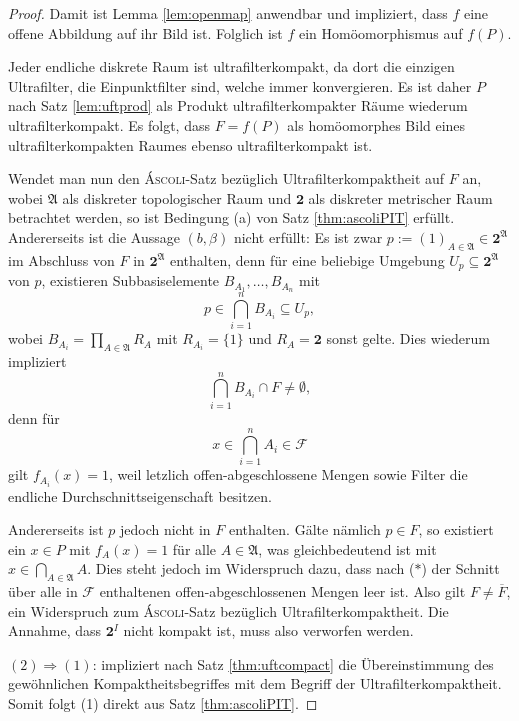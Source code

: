 \begin{proof}
  Damit ist Lemma \ref{lem:openmap} anwendbar und impliziert, dass $f$ eine offene Abbildung auf ihr Bild ist.
  Folglich ist $f$ ein Homöomorphismus auf $f(P)$.

  Jeder endliche diskrete Raum ist ultrafilterkompakt, da dort die einzigen Ultrafilter, die Einpunktfilter sind, welche immer konvergieren.
  Es ist daher $P$ nach Satz \ref{lem:uftprod} als Produkt ultrafilterkompakter Räume wiederum ultrafilterkompakt.
  Es folgt, dass $F = f(P)$ als homöomorphes Bild eines ultrafilterkompakten Raumes ebenso ultrafilterkompakt ist.

  Wendet man nun den \textsc{Áscoli}-Satz bezüglich Ultrafilterkompaktheit auf $F$ an, wobei $\mathfrak{A}$ als diskreter topologischer Raum und $\mathbf{2}$ als diskreter metrischer Raum betrachtet werden, so ist Bedingung (a) von Satz \ref{thm:ascoliPIT} erfüllt.
  Andererseits ist die Aussage $(b, \beta)$ nicht erfüllt:
  Es ist zwar $p := (1)_{A \in \mathfrak{A}} \in \mathbf{2}^\mathfrak{A}$ im Abschluss von $F$ in $\mathbf{2}^\mathfrak{A}$ enthalten, denn für eine beliebige Umgebung $U_p \subseteq \mathbf{2}^\mathfrak{A}$ von $p$, existieren Subbasiselemente $B_{A_1},\dots,B_{A_n}$ mit 
  \begin{displaymath}
    p \in \bigcap_{i=1}^n B_{A_i} \subseteq U_p,
  \end{displaymath}
  wobei $B_{A_i} = \prod_{A \in \mathfrak{A}} R_{A}$ mit  $R_{A_i} = \{1\}$ und $R_A = \mathbf{2}$ sonst gelte.
  Dies wiederum impliziert
  \begin{displaymath}
    \bigcap_{i=1}^n B_{A_i} \cap F \neq \emptyset,
  \end{displaymath}
  denn für 
  \begin{displaymath}
    x \in \bigcap_{i=1}^n A_i \in \mathcal{F}
  \end{displaymath}
  gilt $f_{A_i}(x) = 1$, weil letzlich offen-abgeschlossene Mengen sowie Filter die endliche Durchschnittseigenschaft besitzen.
  
  Andererseits ist $p$ jedoch nicht in $F$ enthalten. 
  Gälte nämlich $p \in F$, so existiert ein $x \in P$ mit $f_A(x) = 1$ für alle $A \in \mathfrak{A}$, was gleichbedeutend ist mit $x \in \bigcap_{A \in \mathfrak{A}} A$.
  Dies steht jedoch im Widerspruch dazu, dass nach ($\ast$) der Schnitt über alle in $\mathcal{F}$ enthaltenen offen-abgeschlossenen Mengen leer ist.
  Also gilt $F \neq \overline{F}$, ein Widerspruch zum \textsc{Áscoli}-Satz bezüglich Ultrafilterkompaktheit.
  Die Annahme, dass $\mathbf{2}^I$ nicht kompakt ist, muss also verworfen werden.

  $(2)\Rightarrow(1)$: \PIT impliziert nach Satz \ref{thm:uftcompact} die Übereinstimmung des gewöhnlichen Kompaktheitsbegriffes mit dem Begriff der Ultrafilterkompaktheit. Somit folgt (1) direkt aus Satz \ref{thm:ascoliPIT}.
\end{proof}

